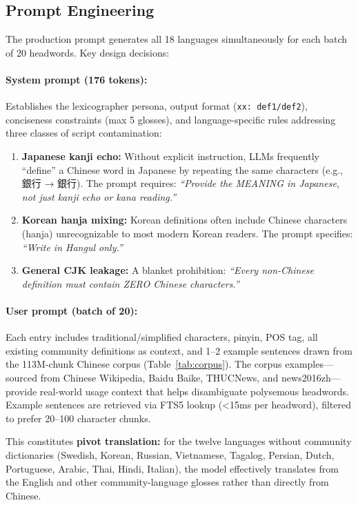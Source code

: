 \documentclass[11pt]{article}
\begin{document}
\subsection{Prompt Engineering}
\label{sec:prompts}

The production prompt generates all 18 languages simultaneously for each batch of 20 headwords. Key design decisions:

\paragraph{System prompt (176 tokens):} Establishes the lexicographer persona, output format (\texttt{xx: def1/def2}), conciseness constraints (max 5 glosses), and language-specific rules addressing three classes of script contamination:

\begin{enumerate}
\item \textbf{Japanese kanji echo:} Without explicit instruction, LLMs frequently ``define'' a Chinese word in Japanese by repeating the same characters (e.g., 銀行 → 銀行). The prompt requires: \textit{``Provide the MEANING in Japanese, not just kanji echo or kana reading.''}
\item \textbf{Korean hanja mixing:} Korean definitions often include Chinese characters (hanja) unrecognizable to most modern Korean readers. The prompt specifies: \textit{``Write in Hangul only.''}
\item \textbf{General CJK leakage:} A blanket prohibition: \textit{``Every non-Chinese definition must contain ZERO Chinese characters.''}
\end{enumerate}

\paragraph{User prompt (batch of 20):} Each entry includes traditional/simplified characters, pinyin, POS tag, all existing community definitions as context, and 1--2 example sentences drawn from the 113M-chunk Chinese corpus (Table~\ref{tab:corpus}). The corpus examples---sourced from Chinese Wikipedia, Baidu Baike, THUCNews, and news2016zh---provide real-world usage context that helps disambiguate polysemous headwords. Example sentences are retrieved via FTS5 lookup ({<}15ms per headword), filtered to prefer 20--100 character chunks.

This constitutes \textbf{pivot translation:} for the twelve languages without community dictionaries (Swedish, Korean, Russian, Vietnamese, Tagalog, Persian, Dutch, Portuguese, Arabic, Thai, Hindi, Italian), the model effectively translates from the English and other community-language glosses rather than directly from Chinese.
\end{document}
